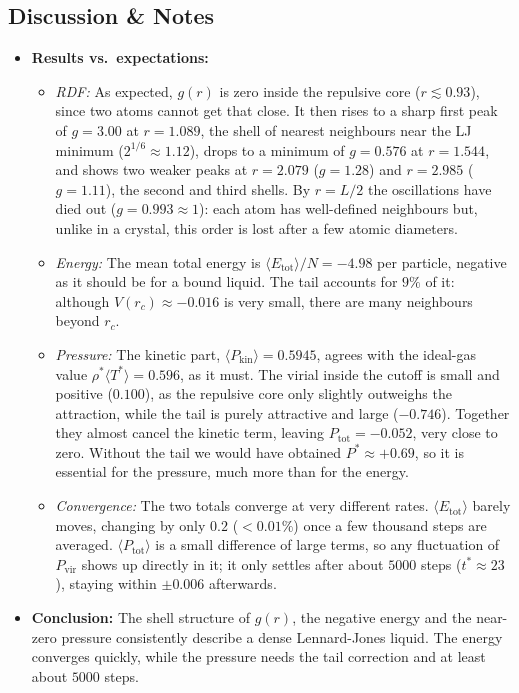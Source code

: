\documentclass[11pt,a4paper]{article}
\begin{document}
\subsection{Discussion \& Notes}
\begin{itemize}
  \item \textbf{Results vs.\ expectations:}
  \begin{itemize}
    \item \emph{RDF:} As expected, $g(r)$ is zero inside the repulsive core ($r \lesssim 0.93$), since two atoms cannot get that close. It then rises to a sharp first peak of $g = 3.00$ at $r = 1.089$, the shell of nearest neighbours near the LJ minimum ($2^{1/6} \approx 1.12$), drops to a minimum of $g = 0.576$ at $r = 1.544$, and shows two weaker peaks at $r = 2.079$ ($g = 1.28$) and $r = 2.985$ ($g = 1.11$), the second and third shells. By $r = L/2$ the oscillations have died out ($g = 0.993 \approx 1$): each atom has well-defined neighbours but, unlike in a crystal, this order is lost after a few atomic diameters.

    \item \emph{Energy:} The mean total energy is $\langle E_{\text{tot}}\rangle/N = -4.98$ per particle, negative as it should be for a bound liquid. The tail accounts for $9\%$ of it: although $V(r_c) \approx -0.016$ is very small, there are many neighbours beyond $r_c$.

    \item \emph{Pressure:} The kinetic part, $\langle P_{\text{kin}}\rangle = 0.5945$, agrees with the ideal-gas value $\rho^* \langle T^*\rangle = 0.596$, as it must. The virial inside the cutoff is small and positive ($0.100$), as the repulsive core only slightly outweighs the attraction, while the tail is purely attractive and large ($-0.746$). Together they almost cancel the kinetic term, leaving $P_{\text{tot}} = -0.052$, very close to zero. Without the tail we would have obtained $P^* \approx +0.69$, so it is essential for the pressure, much more than for the energy.

    \item \emph{Convergence:} The two totals converge at very different rates. $\langle E_{\text{tot}}\rangle$ barely moves, changing by only $0.2$ ($<0.01\%$) once a few thousand steps are averaged. $\langle P_{\text{tot}}\rangle$ is a small difference of large terms, so any fluctuation of $P_{\text{vir}}$ shows up directly in it; it only settles after about $5000$ steps ($t^* \approx 23$), staying within $\pm 0.006$ afterwards.
  \end{itemize}

  \item \textbf{Conclusion:}
  The shell structure of $g(r)$, the negative energy and the near-zero pressure consistently describe a dense Lennard-Jones liquid. The energy converges quickly, while the pressure needs the tail correction and at least about $5000$ steps.
\end{itemize}
\end{document}
